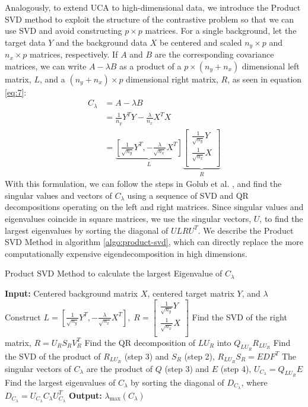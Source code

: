 \documentclass[12pt]{article}
\begin{document}
Analogously, to extend UCA to high-dimensional data, we introduce the Product SVD method to exploit the structure of the contrastive problem so that we can use SVD and avoid constructing $p \times p$ matrices. For a single background, let the target data $Y$ and the background data $X$ be centered and scaled $n_y \times p$ and $n_x \times p$ matrices, respectively. If $A$ and $B$ are the corresponding covariance matrices, we can write $A - \lambda B$ as a product of a $p \times (n_y + n_x)$ dimensional left matrix, $L$, and a $(n_y + n_x) \times p$ dimensional right matrix, $R$, as seen in equation \ref{eq:7}:
\begin{align}
  C_\lambda &= A - \lambda B \nonumber\\
            &=\frac{1}{n_y}Y^TY -\frac{\lambda}{n_x} X^T X\nonumber \\
            &=  \underbrace{\left[ \frac{1}{\sqrt{n_{y}}}Y^T, - \frac{\lambda}{\sqrt{n_{x}}} X^T\right]}_{L}\underbrace{\begin{bmatrix*} \frac{1}{\sqrt{n_{y}}}Y \\ \frac{1}{\sqrt{n_{x}}}X \\ \end{bmatrix*}}_{R} \label{eq:7}
\end{align}
With this formulation, we can follow the steps in Golub et al.  \cite{Golub}, and find the singular values and vectors of $C_\lambda$ using a sequence of SVD and QR decompositions operating on the left and right matrices. Since singular values and eigenvalues coincide in square matrices, we use the singular vectors, $U$, to find the largest eigenvalues by sorting the diagonal of $ULRU^T$.  
We describe the Product SVD Method in algorithm \ref{algo:product-svd}, which can directly replace the more computationally expensive eigendecomposition in high dimensions.

\begin{algorithm}[ht]
  \caption{Product SVD Method to calculate the largest Eigenvalue of $C_\lambda$}
  \label{algo:product-svd}
  \SetAlgoLined
  \textbf{Input:} Centered background matrix $X$, centered target matrix $Y$, and $\lambda$\;
  \nl Construct 
  $  L = \left[ \frac{1}{\sqrt{n_{y}}}Y^T, - \frac{\lambda}{\sqrt{n_{x}}} X^T\right],\;
  R = \begin{bmatrix*} \frac{1}{\sqrt{n_{y}}}Y \\ \frac{1}{\sqrt{n_{x}}}X \\ \end{bmatrix*} $\;
  \nl  Find the SVD of the right matrix, $R = U_R S_R V^T_R$ \;
  \nl  Find the QR decomposition of $LU_R$ into  $Q_{LU_R}R_{LU_R}$ \;
  \nl  Find the SVD of the product of $R_{LU_R}$ (step 3) and $S_R$ (step 2), $R_{LU_R}S_{R} = EDF^T$ \;
  \nl  The singular vectors of $C_\lambda$ are the product of $Q$ (step 3) and $E$ (step 4), $U_{C_\lambda} = Q_{LU_R}E$ \;
  \nl  Find the largest eigenvalues of $C_\lambda$ by sorting the diagonal of $D_{C_\lambda}$, where $D_{C_\lambda} = U_{C_\lambda} C_\lambda U_{C_\lambda}^T$ \;
  \textbf{Output:} $\lambda_{\text{max}}\left( C_\lambda \right)$ 
\end{algorithm}
\end{document}
